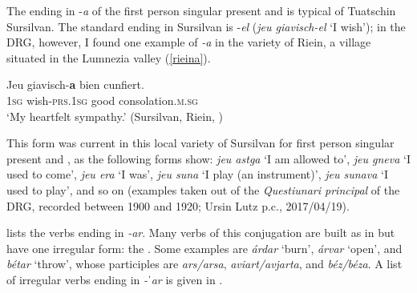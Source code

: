 The ending in -\textit{a} of the first person singular present and  is typical of Tuatschin Sursilvan. The standard ending in Sursilvan is -\textit{el} (\textit{jeu giavisch-el} `I wish'); in the DRG, however, I found one example of \textit{-a} in the variety of Riein, a village situated in the Lumnezia valley (\ref{rieina}).

\ea\label{rieina}
\gll  Jeu giavisch-\textbf{a} bien cunfiert.  \\
     \textsc{1sg} wish-\textsc{prs.1sg} good consolation.\textsc{m.sg}\\
\glt `My heartfelt sympathy.' (Sursilvan, Riein, )
\z

This form was current in this local variety of Sursilvan for first person singular present and , as the following forms show: \textit{jeu astga} `I am allowed to', \textit{jeu gneva} `I used to come', \textit{jeu era} `I was', \textit{jeu suna} `I play (an instrument)', \textit{jeu sunava} `I used to play', and so on (examples taken out of the\textit{ Questiunari principal} of the DRG, recorded between 1900 and 1920; Ursin Lutz p.c., 2017/04/19).


 lists the verbs ending in \textit{-ar}. Many verbs of this conjugation are built as in  but have one irregular form: the . Some examples are \textit{árdar} `burn', \textit{árvar} `open', and \textit{bétar} `throw', whose participles are \textit{ars/arsa}, \textit{aviart/avjarta}, and \textit{béz/béza}. A list of irregular verbs ending in \textit{-ˈar} is given in .


